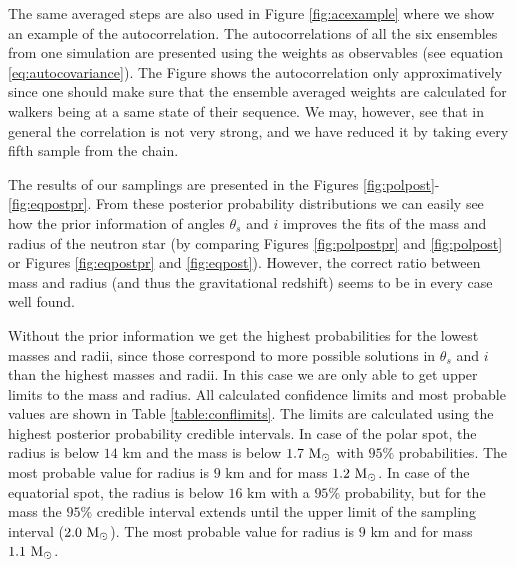 \documentclass{wihuri}
\def\msun{{\rm M_{\odot}}}
\def\thetas{\theta_{s}}
\begin{document}
The same averaged steps are also used in Figure \ref{fig:acexample} where we show an example of the autocorrelation. The autocorrelations of all the six ensembles from one simulation are presented using the weights as observables (see equation \ref{eq:autocovariance}). The Figure shows the autocorrelation only approximatively since one should make sure that the ensemble averaged weights are calculated for walkers being at a same state of their sequence. We may, however, see that in general the correlation is not very strong, and we have reduced it by taking every fifth sample from the chain.%

The results of our samplings are presented in the Figures \ref{fig:polpost}-\ref{fig:eqpostpr}. From these posterior probability distributions we can easily see how the prior information of angles $\thetas$ and $i$ improves the fits of the mass and radius of the neutron star (by comparing Figures \ref{fig:polpostpr} and \ref{fig:polpost} or Figures \ref{fig:eqpostpr} and \ref{fig:eqpost}). However, the correct ratio between mass and radius (and thus the gravitational redshift) seems to be in every case well found.

Without the prior information we get the highest probabilities for the lowest masses and radii, since those correspond to more possible solutions in  $\thetas$ and $i$ than the highest masses and radii. In this case we are only able to get upper limits to the mass and radius. All calculated confidence limits and most probable values are shown in Table \ref{table:conflimits}. The limits are calculated using the highest posterior probability credible intervals. In case of the polar spot, the radius is below $14$ km and the mass is below $1.7 ~\msun$ with $95 \%$ probabilities. The most probable value for radius is $9$ km and for mass $1.2 ~\msun$. In case of the equatorial spot, the radius is below $16$ km with a $95 \%$ probability, but for the mass the $95 \%$ credible interval extends until the upper limit of the sampling interval ($2.0 ~\msun$). The most probable value for radius is $9$ km and for mass $1.1 ~\msun$. 
\end{document}
